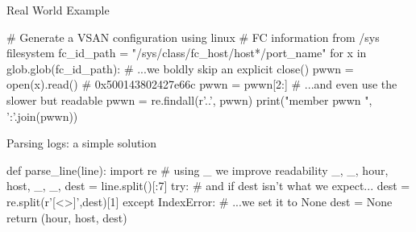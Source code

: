 %

\begin{frame}[fragile]{Real World Example}
\begin{pythoncode}
# Generate a VSAN configuration using linux 
#  FC information from /sys filesystem
fc_id_path = "/sys/class/fc_host/host*/port_name"
for x in glob.glob(fc_id_path):
    # ...we boldly skip an explicit close()
    pwwn = open(x).read()  # 0x500143802427e66c
    pwwn = pwwn[2:]
    # ...and even use the slower but readable
    pwwn = re.findall(r'..', pwwn)
    print("member pwwn ", ':'.join(pwwn))

\end{pythoncode}
\end{frame}

\begin{frame}[fragile]{Parsing logs: a simple solution}
\begin{pythoncode}
def parse_line(line):
    import re
    # using _ we improve readability
    _, _, hour, host, _, _, dest = line.split()[:7]
    try:
        # and if dest isn't what we expect...
        dest = re.split(r'[<>]',dest)[1]
    except IndexError:
        # ...we set it to None
        dest = None
    return (hour, host, dest)
\end{pythoncode}
\end{frame}
